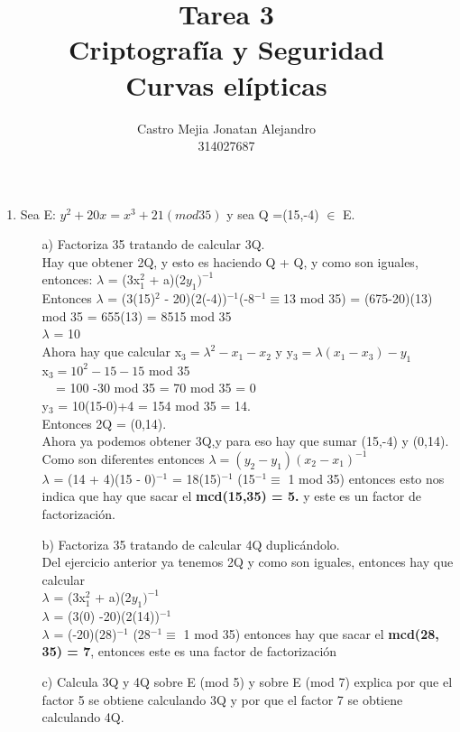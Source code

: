\documentclass[10pt,a4paper]{article}
\author{Castro Mejia Jonatan Alejandro \\ 314027687}
\title{Tarea 3 \\Criptografía y Seguridad \\ Curvas elípticas}
\begin{document}
\maketitle
\begin{enumerate}
\item Sea E: $y^{2}+20x= x^{3}+21(mod 35)$ y sea Q =(15,-4) $\in$ E.
\begin{itemize}
\item[a)] Factoriza 35 tratando de calcular 3Q.
\\Hay que obtener 2Q, y esto es haciendo Q + Q, y como son iguales, entonces: $\lambda$ = (3x$_{1}^{2}$ + a)(2$y_{1})^{-1}$ 
\\Entonces $\lambda$ = (3(15)$^{2}$ - 20)(2(-4))$^{-1}$(-8$^{-1} \equiv $13 mod 35) = (675-20)(13) mod 35 = 655(13) = 8515 mod 35\\
$\lambda$ = 10 \\
Ahora hay que calcular x$_{3} = \lambda ^{2}- x_{1}- x_{2}$ y y$_{3} = \lambda(x_{1} - x_{3})-y_{1}$
\\x$_{3} = 10^{2}-15-15$ mod 35 
\\$~~~~~$= 100 -30 mod 35 = 70 mod 35 = 0
\\y$_{3}$ = 10(15-0)+4 = 154 mod 35 = 14.
\\Entonces 2Q = (0,14).
\\Ahora ya podemos obtener 3Q,y para eso hay que sumar (15,-4) y (0,14).
\\Como son diferentes entonces $\lambda = (y_{2} - y_{1})(x_{2} - x_{1})^{-1}$
\\$\lambda$ = (14 + 4)(15 - 0)$^{-1}$ = 18(15)$^{-1}$ (15$^{-1} \equiv$ 1 mod 35) entonces esto nos indica que hay que sacar el \textbf{mcd(15,35) = 5.} y este es un factor de factorización. 
\item[b)] Factoriza 35 tratando de calcular 4Q duplicándolo.
\\Del ejercicio anterior ya tenemos 2Q y como son iguales, entonces hay que calcular\\ $\lambda$ = (3x$_{1}^{2}$ + a)(2$y_{1})^{-1}$
\\ $\lambda$ = (3(0) -20)(2(14))$^{-1}$
\\ $\lambda$ = (-20)(28)$^{-1}$ (28$^{-1} \equiv $ 1 mod 35) entonces hay que sacar el \textbf{mcd(28, 35) = 7}, entonces este es una factor de factorización
\item[c)] Calcula 3Q y 4Q sobre E (mod 5) y sobre E (mod 7) explica por que el factor 5 se obtiene calculando 3Q y por que el factor 7 se obtiene calculando 4Q.


\end{itemize}
\end{enumerate}
\end{document}
